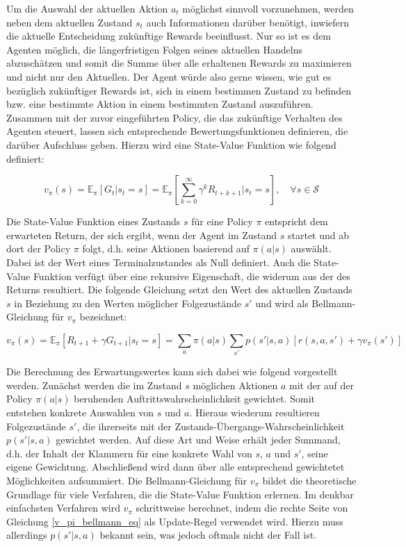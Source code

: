 Um die Auswahl der aktuellen Aktion $a_t$ möglichst sinnvoll vorzunehmen, werden neben dem aktuellen Zustand $s_t$ auch Informationen darüber benötigt, inwiefern die aktuelle Entscheidung zukünftige Rewards beeinflusst. Nur so ist es dem Agenten möglich, die längerfristigen Folgen seines aktuellen Handelns abzuschätzen und somit die Summe über alle erhaltenen Rewards zu maximieren und nicht nur den Aktuellen. Der Agent würde also gerne wissen, \glqq wie gut \grqq{} es bezüglich zukünftiger Rewards ist, sich in einem bestimmen Zustand zu befinden bzw. eine bestimmte Aktion in einem bestimmten Zustand auszuführen. Zusammen mit der zuvor eingeführten Policy, die das zukünftige Verhalten des Agenten steuert, lassen sich entsprechende Bewertungsfunktionen definieren, die darüber Aufschluss geben. Hierzu wird eine State-Value Funktion wie folgend definiert:

\begin{equation*}
  v_\pi(s) = \mathbb{E}_\pi[G_t|s_t=s] = \mathbb{E}_\pi[\sum_{k=0}^{\infty} \gamma^k R_{t+k+1} | s_t=s], \quad \forall s \in \mathcal{S}
  \label{v_pi_eq}
\end{equation*}

Die State-Value Funktion eines Zustands $s$ für eine Policy $\pi$ entspricht dem erwarteten Return, der sich ergibt, wenn der Agent im Zustand $s$ startet und ab dort der Policy $\pi$ folgt, d.h. seine Aktionen basierend auf $\pi(a|s)$ auswählt. Dabei ist der Wert eines Terminalzustandes als Null definiert. Auch die State-Value Funktion verfügt über eine rekursive Eigenschaft, die widerum aus der des Returns resultiert. Die folgende Gleichung setzt den Wert des aktuellen Zustands $s$ in Beziehung zu den Werten möglicher Folgezustände $s'$ und wird als Bellmann-Gleichung für $v_\pi$ bezeichnet:

\begin{equation}
  v_\pi(s) = \mathbb{E}_\pi[R_{t+1} + \gamma G_{t+1} | s_t=s] = \sum_{a} \pi(a|s) \sum_{s'} p(s'|s,a) [r(s,a,s') + \gamma v_\pi(s')]
  \label{v_pi_bellmann_eq}
\end{equation}

Die Berechnung des Erwartungswertes kann sich dabei wie folgend vorgestellt werden. Zunächst werden die im Zustand $s$ möglichen Aktionen $a$ mit der auf der Policy $\pi(a|s)$ beruhenden Auftrittswahrscheinlichkeit gewichtet. Somit entstehen konkrete Auswahlen von $s$ und $a$. Hieraus wiederum resultieren Folgezustände $s'$, die ihrerseits mit der Zustands-Übergangs-Wahrscheinlichkeit $p(s'|s,a)$ gewichtet werden. Auf diese Art und Weise erhält jeder Summand, d.h. der Inhalt der Klammern für eine konkrete Wahl von $s$, $a$ und $s'$, seine eigene Gewichtung. Abschließend wird dann über alle entsprechend gewichtetet Möglichkeiten aufsummiert. Die Bellmann-Gleichung für $v_\pi$ bildet die theoretische Grundlage für viele Verfahren, die die State-Value Funktion erlernen. Im denkbar einfachsten Verfahren wird $v_\pi$ schrittweise berechnet, indem die rechte Seite von Gleichung \eqref{v_pi_bellmann_eq} als Update-Regel verwendet wird. Hierzu muss allerdings $p(s'|s,a)$ bekannt sein, was jedoch oftmals nicht der Fall ist.


